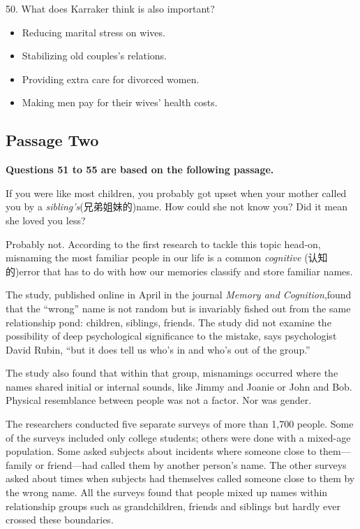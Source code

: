 \documentclass[UTF8,11pt]{ctexart}
\begin{document}
50. What does Karraker think is also important?


\begin{itemize}[leftmargin=2em,itemsep=.2em,topsep=.4em]\item[A.] Reducing marital stress on wives.
\item[B.] Stabilizing old couples’s relations.
\item[C.] Providing extra care for divorced women.
\item[D.] Making men pay for their wives’ health costs.
\end{itemize}

\subsection*{\textbf{Passage Two}}


\textbf{Questions 51 to 55 are based on the following passage.}


If you were like most children, you probably got upset when your mother called you by a\textit{ sibling’s}(兄弟姐妹的)name. How could she not know you? Did it mean she loved you less?


Probably not. According to the first research to tackle this topic head-on, misnaming the most familiar people in our life is a common\textit{ cognitive} (认知的)error that has to do with how our memories classify and store familiar names.


The study, published online in April in the journal\textit{ Memory and Cognition},found that the “wrong” name is not random but is invariably fished out from the same relationship pond: children, siblings, friends. The study did not examine the possibility of deep psychological significance to the mistake, says psychologist David Rubin, “but it does tell us who’s in and who’s out of the group.”


The study also found that within that group, misnamings occurred where the names shared initial or internal sounds, like Jimmy and Joanie or John and Bob. Physical resemblance between people was not a factor. Nor was gender.


The researchers conducted five separate surveys of more than 1,700 people. Some of the surveys included only college students; others were done with a mixed-age population. Some asked subjects about incidents where someone close to them—family or friend—had called them by another person’s name. The other surveys asked about times when subjects had themselves called someone close to them by the wrong name. All the surveys found that people mixed up names within relationship groups such as grandchildren, friends and siblings but hardly ever crossed these boundaries.
\end{document}

